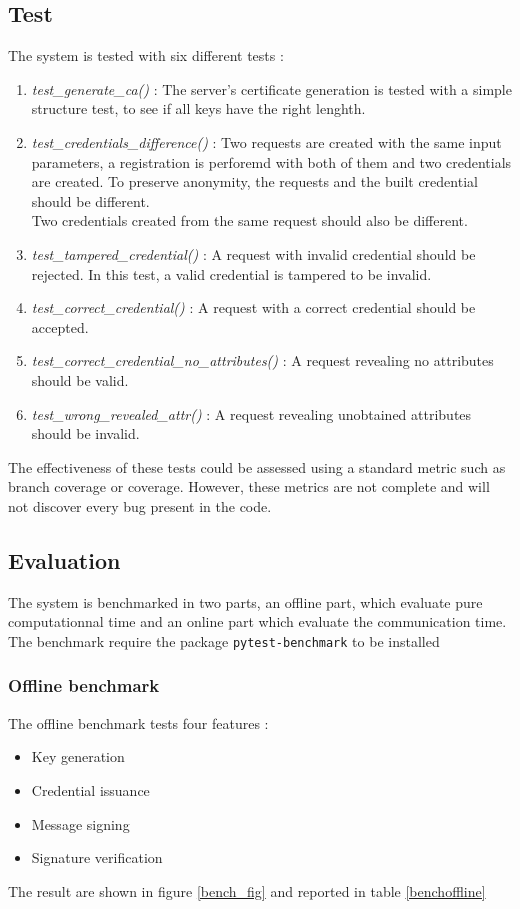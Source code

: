 \documentclass[10pt,conference,compsocconf]{IEEEtran}
\begin{document}
\subsection{Test}
The system is tested with six different tests : 
\begin{enumerate}
    \item \textit{test\_generate\_ca()} : The server's certificate generation is tested with a simple structure test, to see if all keys have the right lenghth.
    \item \textit{test\_credentials\_difference()} : Two requests are created with the same input parameters, a registration is perforemd with both of them and two credentials are created. To preserve anonymity, the requests and the built credential should be different. \\ Two credentials created from the same request should also be different.
    \item \textit{test\_tampered\_credential()} : A request with invalid credential should be rejected. In this test, a valid credential is tampered to be invalid.
    \item \textit{test\_correct\_credential()} : A request with a correct credential should be accepted.
    \item \textit{test\_correct\_credential\_no\_attributes()} : A request revealing no attributes should be valid.
    \item \textit{test\_wrong\_revealed\_attr()} : A request revealing unobtained attributes should be invalid.
\end{enumerate}
The effectiveness of these tests could be assessed using a standard metric such as branch coverage or coverage. However, these metrics are not complete and will not discover every bug present in the code.


\subsection{Evaluation}
The system is benchmarked in two parts, an offline part, which evaluate pure computationnal time and an online part which evaluate the communication time. The benchmark require the package \verb|pytest-benchmark| to be installed

\subsubsection{Offline benchmark}
The offline benchmark tests four features :
\begin{itemize}
    \item Key generation
    \item Credential issuance
    \item Message signing
    \item Signature verification
\end{itemize}
The result are shown in figure \ref{bench_fig}
and reported in table \ref{benchoffline}
\end{document}
